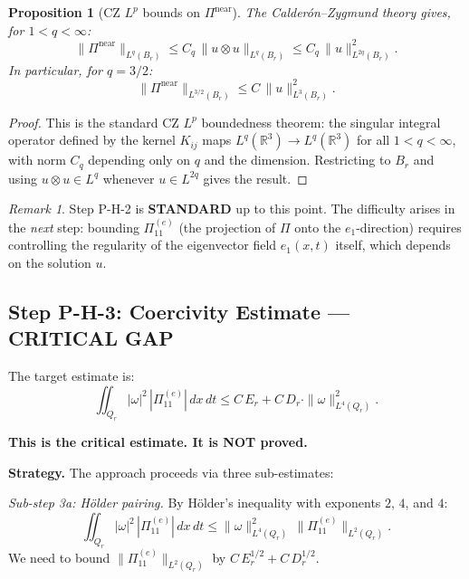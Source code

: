\documentclass[11pt]{article}
\newtheorem{proposition}[theorem]{Proposition}
\theoremstyle{definition}
\theoremstyle{remark}
\newtheorem{remark}[theorem]{Remark}
\newcommand{\R}{\mathbb{R}}
\begin{document}
\begin{proposition}[CZ $L^p$ bounds on $\Pi^{\mathrm{near}}$]
\label{prop:CZ-Lp}
The Calder\'on--Zygmund theory gives, for $1 < q < \infty$:
\begin{equation}\label{eq:CZ-Lp}
  \|\Pi^{\mathrm{near}}\|_{L^q(B_r)} \leq C_q\, \|u\otimes u\|_{L^q(B_r)}
  \leq C_q\, \|u\|_{L^{2q}(B_r)}^2.
\end{equation}
In particular, for $q = 3/2$:
\begin{equation}\label{eq:CZ-3/2}
  \|\Pi^{\mathrm{near}}\|_{L^{3/2}(B_r)} \leq C\, \|u\|_{L^3(B_r)}^2.
\end{equation}
\end{proposition}

\begin{proof}
This is the standard CZ $L^p$ boundedness theorem: the singular integral operator
defined by the kernel $K_{ij}$ maps $L^q(\R^3) \to L^q(\R^3)$ for all
$1 < q < \infty$, with norm $C_q$ depending only on $q$ and the dimension.
Restricting to $B_r$ and using $u\otimes u \in L^{q}$ whenever $u \in L^{2q}$
gives the result.
\end{proof}

\begin{remark}
Step P-H-2 is \textbf{STANDARD} up to this point.  The difficulty arises in the
\emph{next} step: bounding $\Pi_{11}^{(e)}$ (the projection of $\Pi$ onto the
$e_1$-direction) requires controlling the regularity of the eigenvector field
$e_1(x,t)$ itself, which depends on the solution $u$.
\end{remark}

\subsection{Step P-H-3: Coercivity Estimate --- \textbf{CRITICAL GAP}}
\label{sec:PH3}

The target estimate is:
\begin{equation}\label{eq:coercivity-target}
  \boxed{
    \iint_{Q_r} |\omega|^2\, |\Pi_{11}^{(e)}|\, dx\, dt
    \leq C\, E_r + C\, D_r\cdot \|\omega\|_{L^4(Q_r)}^2.
  }
\end{equation}

\textbf{This is the critical estimate.  It is \textbf{NOT} proved.}

\medskip
\noindent\textbf{Strategy.}  The approach proceeds via three sub-estimates:

\smallskip
\noindent\emph{Sub-step 3a: H\"older pairing.}
By H\"older's inequality with exponents $2$, $4$, and $4$:
\begin{equation}\label{eq:holder-split}
  \iint_{Q_r} |\omega|^2\, |\Pi_{11}^{(e)}|\, dx\, dt
  \leq \|\omega\|_{L^4(Q_r)}^2\, \|\Pi_{11}^{(e)}\|_{L^2(Q_r)}.
\end{equation}
We need to bound $\|\Pi_{11}^{(e)}\|_{L^2(Q_r)}$ by $C\, E_r^{1/2} + C\, D_r^{1/2}$.
\end{document}
